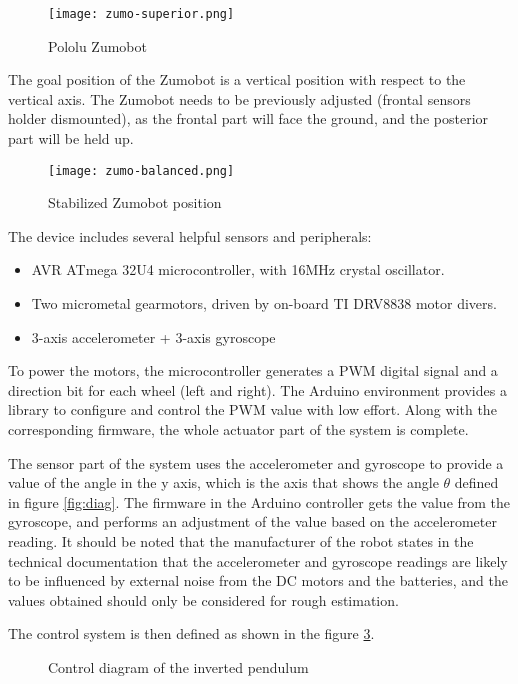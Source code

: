 \begin{figure}[h]
	\centering
	\texttt{[image: zumo-superior.png]}
	\caption{Pololu Zumobot}\label{fig:zumo}
\end{figure}

The goal position of the Zumobot is a vertical position with respect to the vertical axis. The Zumobot needs to be previously adjusted (frontal sensors holder dismounted), as the frontal part will face the ground, and the posterior part will be held up.

\begin{figure}[h]
	\centering
	\texttt{[image: zumo-balanced.png]}
	\caption{Stabilized Zumobot position}\label{fig:zumoStable}
\end{figure}

The device includes several helpful sensors and peripherals:

\begin{itemize}
	\item AVR ATmega 32U4 microcontroller, with 16MHz crystal oscillator.
	\item Two micrometal gearmotors, driven by on-board TI DRV8838 motor divers.
	\item 3-axis accelerometer + 3-axis gyroscope
\end{itemize}

To power the motors, the microcontroller generates a PWM digital signal and a direction bit for each wheel (left and right). The Arduino environment provides a library to configure and control the PWM value with low effort. Along with the corresponding firmware, the whole actuator part of the system is complete.

The sensor part of the system uses the accelerometer and gyroscope to provide a value of the angle in the y axis, which is the axis that shows the angle $\theta$ defined in figure \ref{fig:diag}. The firmware in the Arduino controller gets the value from the gyroscope, and performs an adjustment of the value based on the accelerometer reading. It should be noted that the manufacturer of the robot states in the technical documentation\cite{POL01} that the accelerometer and gyroscope readings are likely to be influenced by external noise from the DC motors and the batteries, and the values obtained should only be considered for rough estimation.

The control system is then defined as shown in the figure \ref{fig:condiag}.

\begin{figure}[h]
	\centering
	\caption{Control diagram of the inverted pendulum}\label{fig:condiag}
\end{figure}

